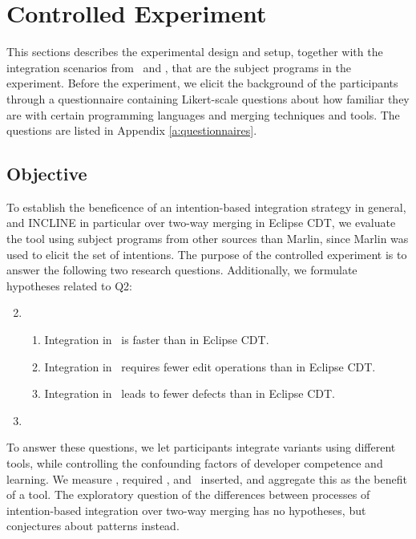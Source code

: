 \section{Controlled Experiment}
This sections describes the experimental design and setup, together with the integration scenarios from \busybox~and \vim, that are the subject programs in the experiment. Before the experiment, we elicit the background of the participants through a questionnaire containing Likert-scale questions about how familiar they are with certain programming languages and merging techniques and tools. The questions are listed in Appendix \ref{a:questionnaires}.

\newcommand{\HA}{Integration in \tooln~is faster than in Eclipse CDT}
\newcommand{\HB}{Integration in \tooln~requires fewer edit operations than in Eclipse CDT}
\newcommand{\HC}{Integration in \tooln~leads to fewer defects than in Eclipse CDT}

\subsection{Objective}
To establish the beneficence of an intention-based integration strategy in general, and INCLINE in particular over two-way merging in Eclipse CDT, we evaluate the tool using subject programs from other sources than Marlin, since Marlin was used to elicit the set of intentions. The purpose of the controlled experiment is to answer the following two research questions. Additionally, we formulate hypotheses related to Q2:

\begin{enumerate}[label={Q\arabic*}]
    \setcounter{enumi}{1}
    \item \RQB
    \begin{enumerate}[label={H\arabic*}]
        \item \HA.
        \item \HB.
        \item \HC.
    \end{enumerate}
    \item \RQC
\end{enumerate}

To answer these questions, we let participants integrate variants using different tools, while controlling the confounding factors of developer competence and learning. We measure \ctime, required \eops, and ~inserted, and aggregate this as the benefit of a tool. The exploratory question of the differences between processes of intention-based integration over two-way merging has no hypotheses, but conjectures about patterns instead.

